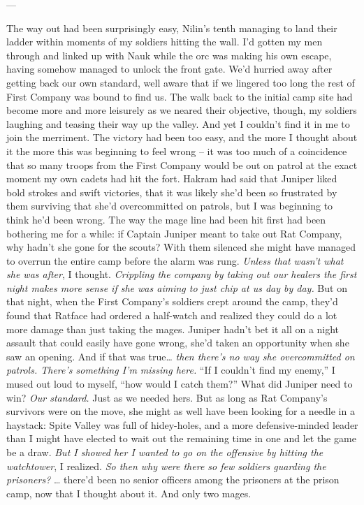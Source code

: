 \documentclass[12pt, openany]{book}
\begin{document}
—

The way out had been surprisingly easy, Nilin’s tenth managing to land their ladder within moments of my soldiers hitting the wall. I’d gotten my men through and linked up with Nauk while the orc was making his own escape, having somehow managed to unlock the front gate. We’d hurried away after getting back our own standard, well aware that if we lingered too long the rest of First Company was bound to find us. The walk back to the initial camp site had become more and more leisurely as we neared their objective, though, my soldiers laughing and teasing their way up the valley. And yet I couldn’t find it in me to join the merriment. The victory had been too easy, and the more I thought about it the more this was beginning to feel wrong – it was too much of a coincidence that so many troops from the First Company would be out on patrol at the exact moment my own cadets had hit the fort. Hakram had said that Juniper liked bold strokes and swift victories, that it was likely she’d been so frustrated by them surviving that she’d overcommitted on patrols, but I was beginning to think he’d been wrong.
The way the mage line had been hit first had been bothering me for a while: if Captain Juniper meant to take out Rat Company, why hadn’t she gone for the scouts? With them silenced she might have managed to overrun the entire camp before the alarm was rung. \textit{Unless that wasn’t what she was after}, I thought. \textit{Crippling the company by taking out our healers the first night makes more sense if she was aiming to just chip at us day by day.} But on that night, when the First Company’s soldiers crept around the camp, they’d found that Ratface had ordered a half-watch and realized they could do a lot more damage than just taking the mages. Juniper hadn’t bet it all on a night assault that could easily have gone wrong, she’d taken an opportunity when she saw an opening. And if that was true…\textit{ then there’s no way she overcommitted on patrols. There’s something I’m missing here.}
“If I couldn’t find my enemy,” I mused out loud to myself, “how would I catch them?”
What did Juniper need to win? \textit{Our standard.} Just as we needed hers. But as long as Rat Company’s survivors were on the move, she might as well have been looking for a needle in a haystack: Spite Valley was full of hidey-holes, and a more defensive-minded leader than I might have elected to wait out the remaining time in one and let the game be a draw. \textit{But I showed her I wanted to go on the offensive by hitting the watchtower}, I realized. \textit{So then why were there so few soldiers guarding the prisoners?} … there’d been no senior officers among the prisoners at the prison camp, now that I thought about it. And only two mages.
\end{document}
